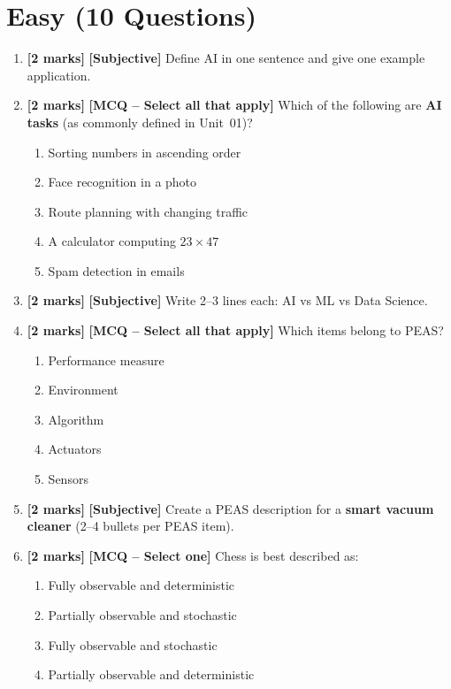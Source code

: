 \documentclass[11pt,a4paper]{article}
\newcommand{\EMarks}{\textbf{[2 marks]} }
\begin{document}
\vspace{0.6em}

\section*{Easy (10 Questions)}
\begin{enumerate}[label=\textbf{E\arabic*.}, leftmargin=*]
  \item \EMarks \textbf{[Subjective]} Define AI in one sentence and give one example application.

  \item \EMarks \textbf{[MCQ -- Select all that apply]} Which of the following are \textbf{AI tasks} (as commonly defined in Unit~01)?
    \begin{enumerate}[label=(\Alph*), leftmargin=*]
      \item Sorting numbers in ascending order
      \item Face recognition in a photo
      \item Route planning with changing traffic
      \item A calculator computing $23 \times 47$
      \item Spam detection in emails
    \end{enumerate}

  \item \EMarks \textbf{[Subjective]} Write 2--3 lines each: AI vs ML vs Data Science.

  \item \EMarks \textbf{[MCQ -- Select all that apply]} Which items belong to PEAS?
    \begin{enumerate}[label=(\Alph*), leftmargin=*]
      \item Performance measure
      \item Environment
      \item Algorithm
      \item Actuators
      \item Sensors
    \end{enumerate}

  \item \EMarks \textbf{[Subjective]} Create a PEAS description for a \textbf{smart vacuum cleaner} (2--4 bullets per PEAS item).

  \item \EMarks \textbf{[MCQ -- Select one]} Chess is best described as:
    \begin{enumerate}[label=(\Alph*), leftmargin=*]
      \item Fully observable and deterministic
      \item Partially observable and stochastic
      \item Fully observable and stochastic
      \item Partially observable and deterministic
    \end{enumerate}


\end{enumerate}
\end{document}
